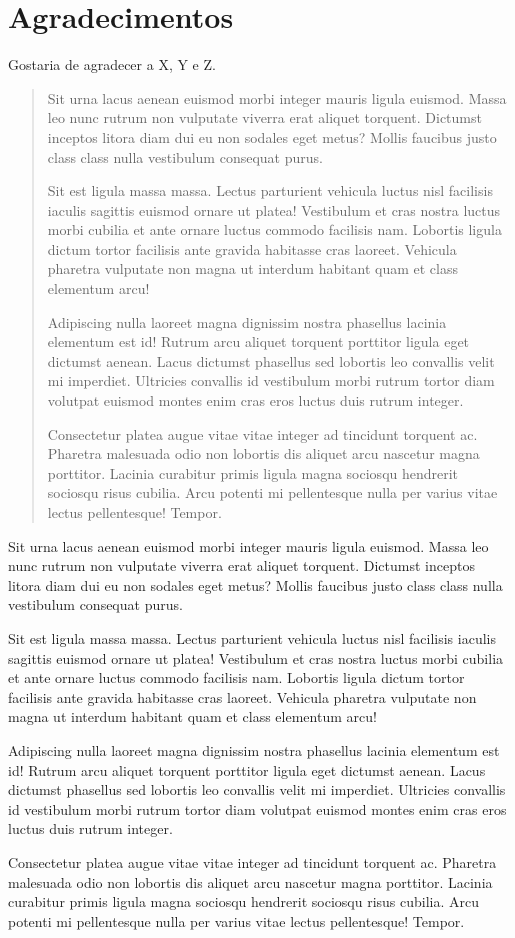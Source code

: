 \documentclass[grad,numbers]{coppe}
\begin{document}
    \chapter*{Agradecimentos}
  Gostaria de agradecer a X, Y e Z.
  \begin{abstract}
Sit urna lacus aenean euismod morbi integer mauris ligula euismod. Massa leo nunc rutrum non vulputate viverra erat aliquet torquent. Dictumst inceptos litora diam dui eu non sodales eget metus? Mollis faucibus justo class class nulla vestibulum consequat purus.

Sit est ligula massa massa. Lectus parturient vehicula luctus nisl facilisis iaculis sagittis euismod ornare ut platea! Vestibulum et cras nostra luctus morbi cubilia et ante ornare luctus commodo facilisis nam. Lobortis ligula dictum tortor facilisis ante gravida habitasse cras laoreet. Vehicula pharetra vulputate non magna ut interdum habitant quam et class elementum arcu!

Adipiscing nulla laoreet magna dignissim nostra phasellus lacinia elementum est id! Rutrum arcu aliquet torquent porttitor ligula eget dictumst aenean. Lacus dictumst phasellus sed lobortis leo convallis velit mi imperdiet. Ultricies convallis id vestibulum morbi rutrum tortor diam volutpat euismod montes enim cras eros luctus duis rutrum integer.

Consectetur platea augue vitae vitae integer ad tincidunt torquent ac. Pharetra malesuada odio non lobortis dis aliquet arcu nascetur magna porttitor. Lacinia curabitur primis ligula magna sociosqu hendrerit sociosqu risus cubilia. Arcu potenti mi pellentesque nulla per varius vitae lectus pellentesque! Tempor.
  \end{abstract}
  \begin{foreignabstract}
Sit urna lacus aenean euismod morbi integer mauris ligula euismod. Massa leo nunc rutrum non vulputate viverra erat aliquet torquent. Dictumst inceptos litora diam dui eu non sodales eget metus? Mollis faucibus justo class class nulla vestibulum consequat purus.

Sit est ligula massa massa. Lectus parturient vehicula luctus nisl facilisis iaculis sagittis euismod ornare ut platea! Vestibulum et cras nostra luctus morbi cubilia et ante ornare luctus commodo facilisis nam. Lobortis ligula dictum tortor facilisis ante gravida habitasse cras laoreet. Vehicula pharetra vulputate non magna ut interdum habitant quam et class elementum arcu!

Adipiscing nulla laoreet magna dignissim nostra phasellus lacinia elementum est id! Rutrum arcu aliquet torquent porttitor ligula eget dictumst aenean. Lacus dictumst phasellus sed lobortis leo convallis velit mi imperdiet. Ultricies convallis id vestibulum morbi rutrum tortor diam volutpat euismod montes enim cras eros luctus duis rutrum integer.

Consectetur platea augue vitae vitae integer ad tincidunt torquent ac. Pharetra malesuada odio non lobortis dis aliquet arcu nascetur magna porttitor. Lacinia curabitur primis ligula magna sociosqu hendrerit sociosqu risus cubilia. Arcu potenti mi pellentesque nulla per varius vitae lectus pellentesque! Tempor.
  \end{foreignabstract}
  \tableofcontents
\end{document}
